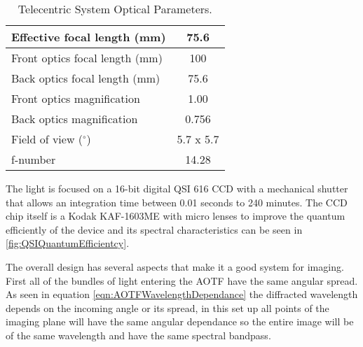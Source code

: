 \begin{table}[h!]
    \begin{center}
    \begin{tabular}{|l|c|}
    \hline
    Effective focal length (mm) & 75.6 \\
    \hline
    Front optics focal length (mm) & 100 \\
    \hline
    Back optics focal length (mm) & 75.6 \\
    \hline
    Front optics magnification & 1.00 \\
    \hline
    Back optics magnification & 0.756 \\
    \hline
    Field of view ($^{\circ}$) & 5.7 x 5.7 \\
    \hline
    f-number & 14.28 \\
    \hline
    \end{tabular}
    \end{center}
    \caption{Telecentric System Optical Parameters.}
    \label{tab:telecenticSystemParameters}
\end{table}

The light is focused on a 16-bit digital QSI 616 CCD with a mechanical shutter that allows an integration time between 0.01 seconds to 240 minutes. The CCD chip itself is a Kodak KAF-1603ME with micro lenses to improve the quantum efficiently of the device and its spectral characteristics can be seen in \autoref{fig:QSIQuantumEfficientcy}.


The overall design has several aspects that make it a good system for imaging. First all of the bundles of light entering the AOTF have the same angular spread. As seen in equation \autoref{eqn:AOTFWavelengthDependance} the diffracted wavelength depends on the incoming angle or its spread, in this set up all points of the imaging plane will have the same angular dependance so the entire image will be of the same wavelength and have the same spectral bandpass.


